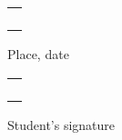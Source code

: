 {\begin{minipage}{0.3\textwidth}
    \begin{tabularx}{\textwidth}{|X|}
        \hline
        \\
        \\
        \\
        \\
        \hline
    \end{tabularx}
    Place, date
\end{minipage}\begin{minipage}{0.1\textwidth}
     \phantom{a}
\end{minipage}\begin{minipage}{0.6\textwidth}
    \begin{tabularx}{\textwidth}{|X|}
        \hline
        \\
        \\
        \\
        \\
        \hline
    \end{tabularx}
    \raggedleft Student's signature
\end{minipage}
}
% 